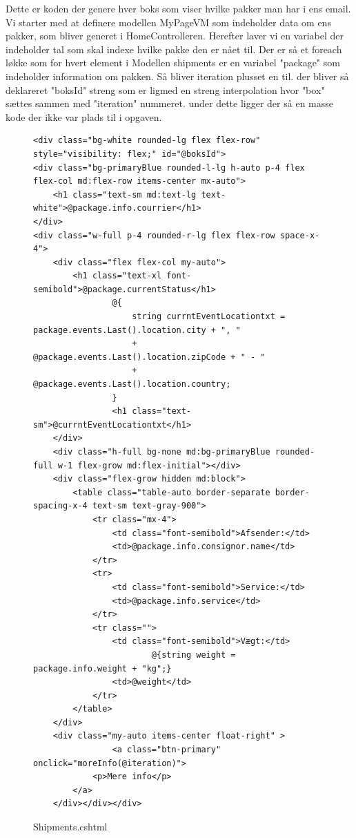 Dette er koden der genere hver boks som viser hvilke pakker man har i ens email. Vi starter med at 
definere modellen MyPageVM som indeholder data om ens pakker, som bliver generet i HomeControlleren.
Herefter laver vi en variabel der indeholder tal som skal indexe hvilke pakke den er nået til. Der er så 
et foreach løkke som for hvert element i Modellen shipments er en variabel "package" som indeholder information
om pakken. Så bliver iteration plusset en til. der bliver så deklareret "boksId" streng som er ligmed en streng interpolation
hvor "box" sættes sammen med "iteration" nummeret. under dette ligger der så en masse kode der ikke var plads til i opgaven.
\newpage
\begin{figure}[!h]
    \begin{verbatim}
<div class="bg-white rounded-lg flex flex-row" style="visibility: flex;" id="@boksId">
<div class="bg-primaryBlue rounded-l-lg h-auto p-4 flex flex-col md:flex-row items-center mx-auto">
    <h1 class="text-sm md:text-lg text-white">@package.info.courrier</h1>
</div>
<div class="w-full p-4 rounded-r-lg flex flex-row space-x-4">
    <div class="flex flex-col my-auto">
        <h1 class="text-xl font-semibold">@package.currentStatus</h1>
                @{
                    string currntEventLocationtxt = package.events.Last().location.city + ", " 
                    + @package.events.Last().location.zipCode + " - " 
                    + @package.events.Last().location.country;
                }
                <h1 class="text-sm">@currntEventLocationtxt</h1>
    </div>
    <div class="h-full bg-none md:bg-primaryBlue rounded-full w-1 flex-grow md:flex-initial"></div>
    <div class="flex-grow hidden md:block">
        <table class="table-auto border-separate border-spacing-x-4 text-sm text-gray-900">
            <tr class="mx-4">
                <td class="font-semibold">Afsender:</td>
                <td>@package.info.consignor.name</td>
            </tr>
            <tr>
                <td class="font-semibold">Service:</td>
                <td>@package.info.service</td>
            </tr>
            <tr class="">
                <td class="font-semibold">Vægt:</td>
                        @{string weight = package.info.weight + "kg";}
                <td>@weight</td>
            </tr>
        </table>
    </div>
    <div class="my-auto items-center float-right" >
                <a class="btn-primary" onclick="moreInfo(@iteration)">
            <p>Mere info</p>
        </a>
    </div></div></div>
\end{verbatim}
\caption{Shipments.cshtml}
\label{code:Shipments.cs}
\end{figure}

